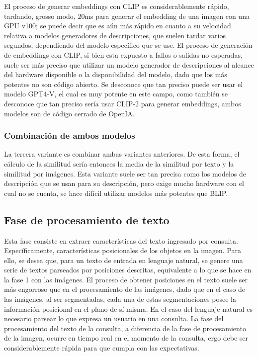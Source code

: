El proceso de generar embeddings con CLIP es considerablemente rápido, tardando, grosso modo, 20ms para generar el embedding de una imagen con una GPU v100; se puede decir que es aún más rápido en cuanto a su velocidad relativa a modelos generadores de descripciones, que suelen tardar varios segundos, dependiendo del modelo específico que se use. El proceso de generación de embeddings con CLIP, si bien esta expuesto a fallos o salidas no esperadas, suele ser más preciso que utilizar un modelo generador de descripciones al alcance del hardware disponible o la disponibilidad del modelo, dado que los más potentes no son código abierto. Se desconoce que tan preciso puede ser usar el modelo GPT4-V, el cual es muy potente en este campo, como también se desconoce que tan preciso sería usar CLIP-2 para generar embeddings, ambos modelos son de código cerrado de OpenIA.

\subsubsection*{Combinaci\'on de ambos modelos}
La tercera variante es combinar ambas variantes anteriores. De esta forma, el cálculo de la similitud sería entonces la media de la similitud por texto y la similitud por imágenes. Esta variante suele ser tan precisa como los modelos de descripción que se usan para su descripción, pero exige mucho hardware con el cual no se cuenta, se hace dif\'icil utilizar modelos más potentes que BLIP.

\subsection*{Fase de procesamiento de texto}

Esta fase consiste en extraer características del texto ingresado por consulta. Específicamente, características posicionales de los objetos en la imagen. Para ello, se desea que, para un texto de entrada en lenguaje natural, se genere una serie de textos parseados por posiciones descritas, equivalente a lo que se hace en la fase 1 con las imágenes. El proceso de obtener posiciones en el texto suele ser más engorroso que en el procesamiento de las imágenes, dado que en el caso de las imágenes, al ser segmentadas, cada una de estas segmentaciones posee la información posicional en el plano de sí misma. En el caso del lenguaje natural es necesario parsear lo que expresa un usuario en una consulta. La fase del procesamiento del texto de la consulta, a diferencia de la fase de procesamiento de la imagen, ocurre en tiempo real en el momento de la consulta, ergo debe ser considerablemente rápida para que cumpla con las expectativas.


